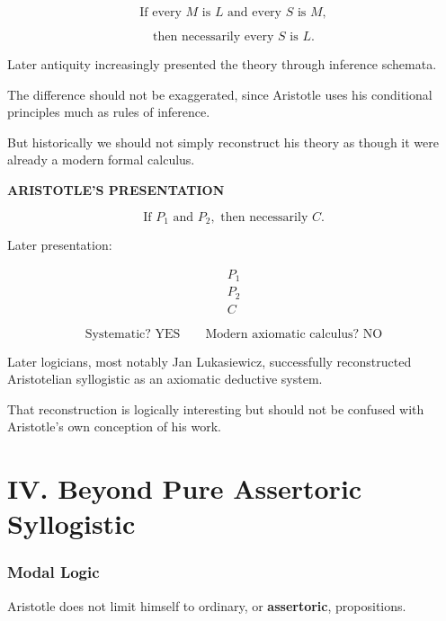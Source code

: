 \documentclass[11pt]{article}
\begin{document}
\[
\text{If every }M\text{ is }L
\text{ and every }S\text{ is }M,
\]

\[
\text{then necessarily every }S\text{ is }L.
\]

Later antiquity increasingly presented the theory through
inference schemata.

The difference should not be exaggerated, since Aristotle uses
his conditional principles much as rules of inference.

But historically we should not simply reconstruct his theory as
though it were already a modern formal calculus.

\begin{whiteboard}
\textbf{ARISTOTLE'S PRESENTATION}

\[
\text{If }P_1\text{ and }P_2,
\text{ then necessarily }C.
\]

Later presentation:

\[
\begin{array}{c}
P_1\\
P_2\\
\hline
C
\end{array}
\]

\[
\boxed{
\text{Systematic? YES}
\qquad
\text{Modern axiomatic calculus? NO}
}
\]
\end{whiteboard}

Later logicians, most notably Jan Lukasiewicz, successfully
reconstructed Aristotelian syllogistic as an axiomatic deductive
system.

That reconstruction is logically interesting but should not be
confused with Aristotle's own conception of his work.


\part*{IV. Beyond Pure Assertoric Syllogistic}

\section{Modal Logic}

Aristotle does not limit himself to ordinary, or
\textbf{assertoric}, propositions.
\end{document}
